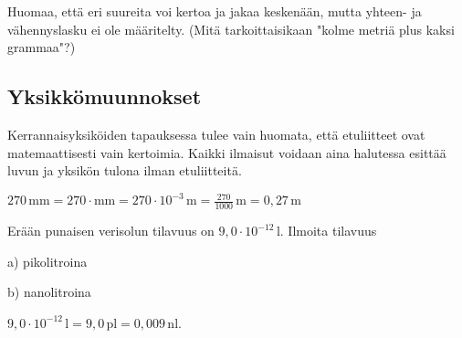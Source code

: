 

Huomaa, että eri suureita voi kertoa ja jakaa keskenään, mutta yhteen- ja vähennyslasku ei ole määritelty. (Mitä tarkoittaisikaan "kolme metriä plus kaksi grammaa"?)

\subsection*{Yksikkömuunnokset}

Kerrannaisyksiköiden tapauksessa tulee vain huomata, että etuliitteet ovat matemaattisesti vain kertoimia. Kaikki ilmaisut voidaan aina halutessa esittää luvun ja yksikön tulona ilman etuliitteitä. %

\begin{esimerkki}
$270\,\text{mm}=270\cdot\text{mm}=270\cdot10^{-3}\,\text{m}=\frac{270}{1000}\,\text{m}=0,27\,\text{m}$
\end{esimerkki}

\begin{esimerkki}
Erään punaisen verisolun tilavuus on $9,0 \cdot 10^{-12}\,\textrm{l}$. Ilmoita tilavuus

a) pikolitroina

b) nanolitroina

\begin{esimratk}
$9,0 \cdot 10^{-12}\,\textrm{l} = 9,0\,\textrm{pl} = 0,009\,\textrm{nl}$.
\end{esimratk}
\end{esimerkki}


